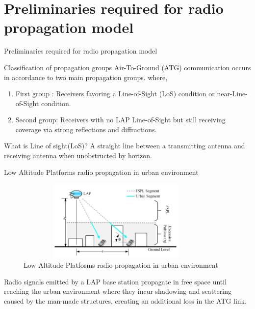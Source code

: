 \documentclass{beamer}
\begin{document}
\section{Preliminaries required for radio propagation model }
\begin{frame}{Preliminaries required for radio propagation model}
        \begin{block}{Classification of propagation groups}
     Air-To-Ground (ATG) communication occurs in accordance to two main propagation groups. where,
    \begin{enumerate}
        \item First group : Receivers favoring a Line-of-Sight (LoS) condition or near-Line-of-Sight condition.
        \item Second group: Receivers with no LAP Line-of-Sight but still receiving coverage via strong reflections and diffractions.
    \end{enumerate}

        \end{block}
    
    \begin{block}{What is Line of sight(LoS)?}
A straight line between a transmitting antenna and receiving antenna when unobstructed by horizon.
\end{block}
    
\end{frame}

\begin{frame}{Low Altitude Platforms radio propagation in urban environment }

\begin{figure}
    \centering
    \includegraphics[width=10cm, height=4cm]{Figures/Figure1.png}
    \caption{Low Altitude Platforms radio propagation in urban environment}
    \label{fig:1}
\end{figure}
Radio signals emitted by a LAP base station propagate in free space until reaching the urban environment where they incur shadowing and scattering caused by the man-made structures, creating an additional loss in the ATG link.

\end{frame}
\end{document}
